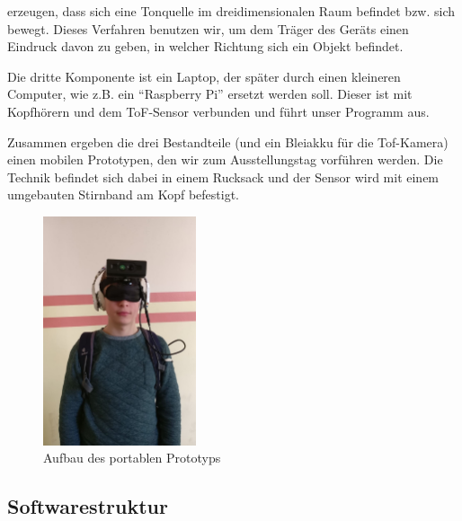 \documentclass[a4paper,12pt,ngerman]{scrartcl}
\begin{document}
erzeugen, dass sich eine Tonquelle im dreidimensionalen
Raum befindet bzw. sich bewegt. Dieses Verfahren benutzen wir, um dem Träger des Geräts einen Eindruck
davon zu geben, in welcher Richtung sich ein Objekt befindet.\par 
Die dritte Komponente ist ein Laptop, der später durch einen kleineren Computer, wie z.B. ein \enquote{Raspberry Pi}
ersetzt werden soll. Dieser ist mit Kopfhörern und dem ToF-Sensor 
verbunden und führt unser Programm aus.\par 
Zusammen ergeben die drei Bestandteile (und ein Bleiakku für die Tof-Kamera) einen mobilen Prototypen, den wir zum Ausstellungstag vorführen werden. Die Technik befindet sich dabei in einem Rucksack und der Sensor wird mit einem
umgebauten Stirnband am Kopf befestigt. 
\begin{figure}[H]
	\centering
	\includegraphics[width=0.4\textwidth]{device}
	\caption{Aufbau des portablen Prototyps}
	\label{dosuas_device}
\end{figure} 

\subsection{Softwarestruktur}
\end{document}
